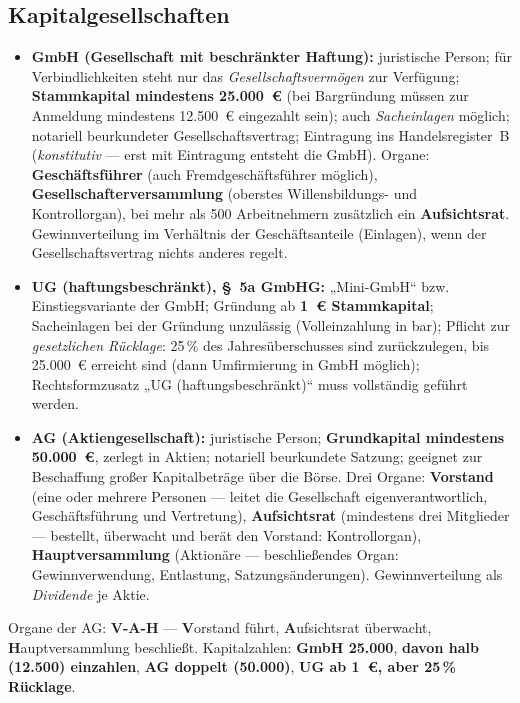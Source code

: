 \documentclass[11pt, a4paper]{article}
\begin{document}
\subsection{Kapitalgesellschaften}

\begin{itemize}
  \item \textbf{GmbH (Gesellschaft mit beschränkter Haftung):} juristische Person; für
    Verbindlichkeiten steht nur das \emph{Gesellschaftsvermögen} zur Verfügung;
    \textbf{Stammkapital mindestens 25.000~€} (bei Bargründung müssen zur Anmeldung
    mindestens 12.500~€ eingezahlt sein); auch \emph{Sacheinlagen} möglich; notariell
    beurkundeter Gesellschaftsvertrag; Eintragung ins Handelsregister~B
    (\emph{konstitutiv} --- erst mit Eintragung entsteht die GmbH). Organe:
    \textbf{Geschäftsführer} (auch Fremdgeschäftsführer möglich),
    \textbf{Gesellschafterversammlung} (oberstes Willensbildungs- und Kontrollorgan),
    bei mehr als 500 Arbeitnehmern zusätzlich ein \textbf{Aufsichtsrat}. Gewinnverteilung im
    Verhältnis der Geschäftsanteile (Einlagen), wenn der Gesellschaftsvertrag nichts
    anderes regelt.
  \item \textbf{UG (haftungsbeschränkt), §~5a GmbHG:} „Mini-GmbH`` bzw.
    Einstiegsvariante der GmbH; Gründung ab \textbf{1~€ Stammkapital}; Sacheinlagen bei
    der Gründung unzulässig (Volleinzahlung in bar); Pflicht zur \emph{gesetzlichen
    Rücklage}: 25\,\% des Jahresüberschusses sind zurückzulegen, bis 25.000~€ erreicht
    sind (dann Umfirmierung in GmbH möglich); Rechtsformzusatz „UG
    (haftungsbeschränkt)`` muss vollständig geführt werden.
  \item \textbf{AG (Aktiengesellschaft):} juristische Person; \textbf{Grundkapital
    mindestens 50.000~€}, zerlegt in Aktien; notariell beurkundete Satzung; geeignet zur
    Beschaffung großer Kapitalbeträge über die Börse. Drei Organe:
    \textbf{Vorstand} (eine oder mehrere Personen --- leitet die Gesellschaft
    eigenverantwortlich, Geschäftsführung und Vertretung), \textbf{Aufsichtsrat}
    (mindestens drei Mitglieder --- bestellt, überwacht und berät den Vorstand:
    Kontrollorgan), \textbf{Hauptversammlung} (Aktionäre --- beschließendes Organ:
    Gewinnverwendung, Entlastung, Satzungsänderungen). Gewinnverteilung als
    \emph{Dividende} je Aktie.
\end{itemize}

\begin{eselsbruecke}
Organe der AG: \textbf{V-A-H} --- \textbf{V}orstand führt, \textbf{A}ufsichtsrat
überwacht, \textbf{H}auptversammlung beschließt. Kapitalzahlen: \textbf{GmbH 25.000},
\textbf{davon halb (12.500) einzahlen}, \textbf{AG doppelt (50.000)}, \textbf{UG ab 1~€,
aber 25\,\% Rücklage}.
\end{eselsbruecke}
\end{document}
